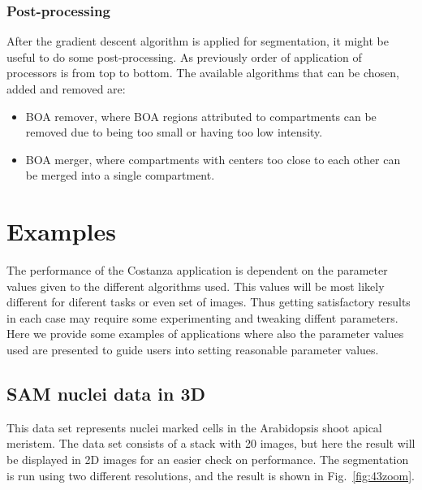 \documentclass[a4paper,12pt]{article}
\begin{document}
\subsubsection{Post-processing}

After the gradient descent algorithm is applied for segmentation, it might be
useful to do some post-processing. As previously order of application of processors is from top to bottom. The available algorithms that can be chosen, added and removed are:

\begin{itemize} 
%
\item BOA remover, where BOA regions attributed to compartments can be removed due to being too small
	or having too low intensity.
%
\item BOA merger, where compartments with centers too close to each other can be
	merged into a single compartment.
%
\end{itemize}

\section{Examples}

The performance of the Costanza application is dependent on the
parameter values given to the different algorithms used. This values will be most likely different for diferent tasks or even set of images. Thus getting satisfactory results in each case may require some experimenting and tweaking diffent parameters. Here we provide
some examples of applications where also the parameter values used are
presented to guide users into setting reasonable parameter values.

\subsection{SAM nuclei data in 3D}

This data set represents nuclei marked cells in the Arabidopsis shoot apical
meristem. The data set consists of a stack with 20 images, but here the result
will be displayed in 2D images for an easier check on performance. The
segmentation is run using two different resolutions, and the result is shown
in Fig.~\ref{fig:43zoom}.
\end{document}
